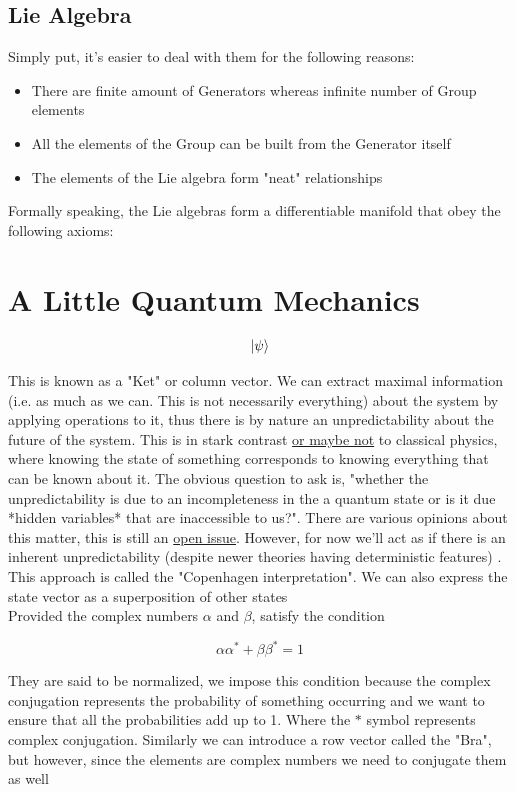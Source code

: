 \documentclass[]{article}
\begin{document}
\subsection{Lie Algebra}
Simply put, it's easier to deal with them for the following reasons:
\begin{itemize}
\item There are finite amount of Generators whereas infinite number of Group elements
\item All the elements of the Group can be built from the Generator itself
\item The elements of the Lie algebra form "neat" relationships
\end{itemize}

Formally speaking, the Lie algebras form a differentiable manifold that obey the following axioms:

\section{A Little Quantum Mechanics}
$$\ket{\psi}$$

This is known as a "Ket" or column vector. We can extract maximal information (i.e. as much as we can. This is not necessarily everything) about the system by applying operations to it, thus there is by nature an unpredictability about the future of the system. This is in stark contrast \href{https://arxiv.org/abs/1909.04514}{or maybe not} to classical physics, where knowing the state of something corresponds to knowing everything that can be known about it. The obvious question to ask is, "whether the unpredictability is due to an incompleteness in the a quantum state or is it due *hidden variables* that are inaccessible to us?". There are various opinions about this matter, this is still an \href{https://plato.stanford.edu/entries/qt-issues/#QuesQuanStatReal}{open issue}. However, for now we'll act as if there is an inherent unpredictability (despite newer theories having deterministic features) . This approach is called the "Copenhagen interpretation". We can also express the state vector as a superposition of other states\\


Provided the complex numbers $\alpha$ and $\beta$, satisfy the condition

$$\alpha \alpha^{*} + \beta \beta^{*} = 1 $$

They are said to be normalized, we impose this condition because the complex conjugation represents the probability of something occurring and we want to ensure that all the probabilities add up to 1. Where the $*$ symbol represents complex conjugation. Similarly we can introduce a row vector called the "Bra", but however, since the elements are complex numbers we need to conjugate them as well
\end{document}
